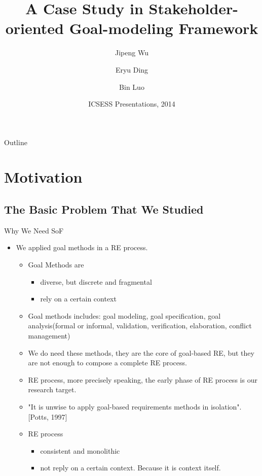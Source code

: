 \documentclass{beamer}
\title[A Case Study in SoF] {A Case Study in Stakeholder-oriented Goal-modeling Framework}
\subtitle{}
\author[Author]{Jipeng Wu \and Eryu Ding \and Bin Luo}
\institute[Universities of Somewhere and Elsewhere] {
                                 Software Institute\\
                                 Nanjing University
     }
\date[ICSESS 2014]
{ICSESS Presentations, 2014}
\begin{document}
\begin{frame}
  \titlepage
\end{frame}

\begin{frame}{Outline}
  \tableofcontents
\end{frame}

\section{Motivation}
\subsection{The Basic Problem That We Studied}
\begin{frame}{Why We Need SoF}              
  \footnotesize{
  \begin{itemize}
  \item
    We applied goal methods in a RE process.
    \begin{itemize}
    \item Goal Methods are
      \begin{itemize}
      \item diverse, but discrete and fragmental  
      \item rely on a certain context 
      \end{itemize}
    \item
      Goal methods includes: goal modeling, goal specification, goal analysis(formal or informal, validation, verification, elaboration, conflict management)
    \item 
      We do need these methods, they are the core of goal-based RE, but they are not enough to compose a complete RE process.
    \item 
      RE process, more precisely speaking, the early phase of RE process is our research target.
    \item
      "It is unwise to apply goal-based requirements methods in isolation". [Potts, 1997] 
    \item RE process 
      \begin{itemize}
      \item consistent and monolithic
      \item not reply on a certain context.   Because it is context itself.
      \end{itemize}
    \end{itemize}
  \end{itemize}
  }
\end{frame}
\end{document}
